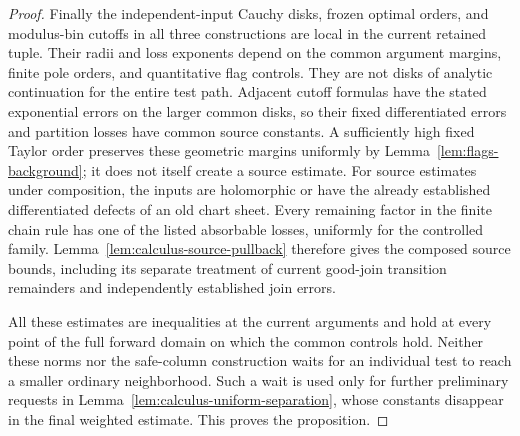 \begin{proof}
Finally the independent-input Cauchy disks, frozen optimal orders,
and modulus-bin cutoffs in all three constructions are local in the
current retained tuple.  Their radii and loss exponents depend on
the common argument margins, finite pole orders, and quantitative flag
controls.  They are not disks of analytic continuation for the entire
test path.  Adjacent cutoff formulas have the stated exponential errors
on the larger common disks, so their fixed differentiated errors and
partition losses have common source constants.  A sufficiently high
fixed Taylor order preserves these geometric margins uniformly by
Lemma~\ref{lem:flags-background}; it does not itself create a source
estimate.  For source estimates under composition, the inputs are
holomorphic or have the already established differentiated defects of an
old chart sheet.  Every remaining factor in the finite chain rule has
one of the listed absorbable losses, uniformly for the controlled family.
Lemma~\ref{lem:calculus-source-pullback} therefore gives the composed
source bounds, including its separate treatment of current good-join
transition remainders and independently established join errors.

All these estimates are inequalities at the current arguments and hold
at every point of the full forward domain on which the common controls
hold.  Neither these norms nor the safe-column construction waits for an
individual test to reach a smaller ordinary neighborhood.  Such a wait
is used only for further preliminary requests in
Lemma~\ref{lem:calculus-uniform-separation}, whose constants disappear in
the final weighted estimate.  This proves the proposition.
\end{proof}
